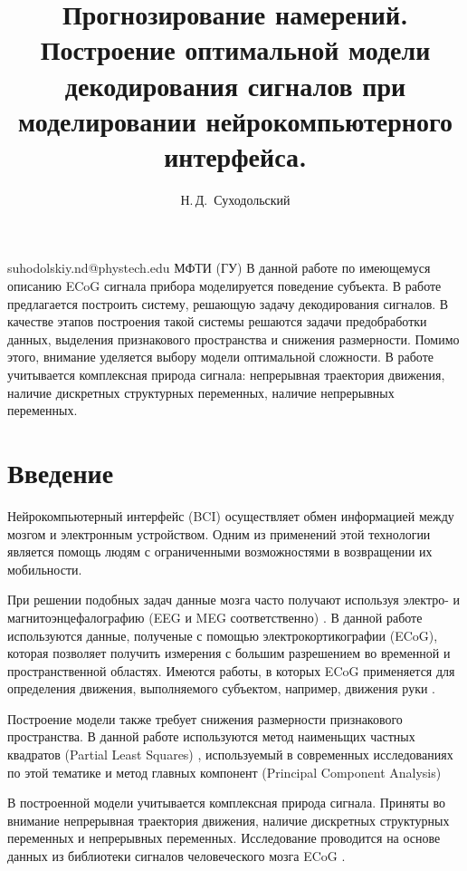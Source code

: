\documentclass[12pt,twoside]{article}
\begin{document}
\title
    {Прогнозирование намерений. Построение оптимальной модели декодирования сигналов при моделировании нейрокомпьютерного интерфейса.}
\author
    {Н.\,Д.~Суходольский} 
\email
    {suhodolskiy.nd@phystech.edu}
\organization
    {МФТИ (ГУ)}
\abstract
    {В данной работе по имеющемуся описанию ECoG сигнала прибора моделируется поведение субъекта. В работе предлагается построить систему, решающую задачу декодирования сигналов. В качестве этапов построения такой системы решаются задачи предобработки данных, выделения признакового пространства и снижения размерности. Помимо этого, внимание уделяется выбору модели оптимальной сложности. В работе учитывается комплексная природа сигнала: непрерывная траектория движения, наличие дискретных структурных переменных, наличие непрерывных переменных.}

\maketitle
\linenumbers

\section{Введение}
    {Нейрокомпьютерный интерфейс (BCI) осуществляет обмен информацией между мозгом и электронным устройством. Одним из применений этой технологии является помощь людям с ограниченными возможностями в возвращении их мобильности.
    
    При решении подобных задач данные мозга часто получают используя электро- и магнитоэнцефалографию (EEG и MEG соответственно) \cite{Waldert2008}. В данной работе используются данные, полученые с помощью электрокортикографии (ECoG), которая позволяет получить измерения с большим разрешением во временной и пространственной областях. Имеются работы, в которых ECoG применяется для определения движения, выполняемого субъектом, например, движения руки \cite{Chao2010}.

Построение модели также требует снижения размерности признакового пространства. В данной работе используются метод наименьщих частных квадратов (Partial Least Squares) \cite{Krishnan2011}, используемый в современных исследованиях по этой тематике \cite{Eliseyev2011} \cite{Eliseyev2012} и метод главных компонент (Principal Component Analysis) \cite{Brems2017}

В построенной модели учитывается комплексная природа сигнала. Приняты во внимание непрерывная траектория движения, наличие дискретных структурных переменных и непрерывных переменных. Исследование проводится на основе данных из библиотеки сигналов человеческого мозга ECoG \cite{Data2016}. 
}


\end{document}
